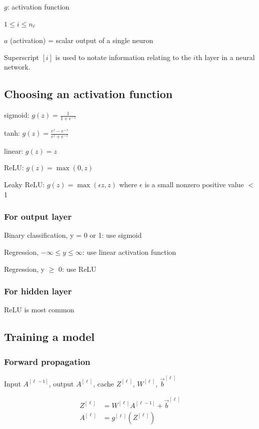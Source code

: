 \documentclass[12pt]{article}
\begin{document}
$g$: activation function

$1 \leq i \leq n_{\ell}$

$a$ (activation) = scalar output of a single neuron

Superscript $[i]$ is used to notate information relating to the $i$th layer in a neural network.

\subsection{Choosing an activation function}

sigmoid: $g(z) = \frac{1}{1 + e^{-z}}$

tanh: $g(z) = \frac{e^z - e^{-z}}{e^z + e^{-z}}$

linear: $g(z) = z$

ReLU: $g(z) = \max(0, z)$

Leaky ReLU: $g(z) = \max(\epsilon z, z)$ where $\epsilon$ is a small nonzero positive value $<$ 1

\subsubsection*{For output layer}

Binary classification, y = 0 or 1: use sigmoid

Regression, $-\infty \leq y \leq \infty$: use linear activation function

Regression, y $\geq$ 0: use ReLU

\subsubsection*{For hidden layer}

ReLU is most common

\subsection{Training a model}
\subsubsection{Forward propagation}

Input $A^{[\ell-1]}$, output $A^{[\ell]}$, cache $Z^{[\ell]}$, $W^{[\ell]}$, $\vec{b}^{[\ell]}$

\begin{align*}
    Z^{[\ell]} &= W^{[\ell]} A^{[\ell-1]} + \vec{b}^{[\ell]}\\
    A^{[\ell]} &= g^{[\ell]}(Z^{[\ell]})
\end{align*}
\end{document}
